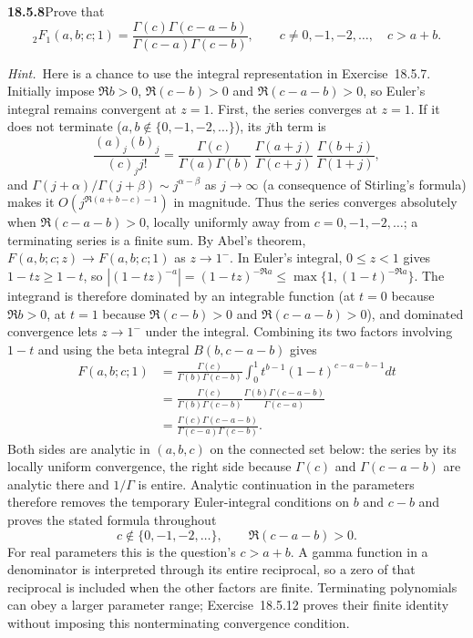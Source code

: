 \par\bigskip
\noindent\textbf{18.5.8}\quad Prove that
\[
{}_{2}F_{1}(a,b;c;1)=\frac{\Gamma(c)\Gamma(c-a-b)}
{\Gamma(c-a)\Gamma(c-b)},\qquad c\neq0,-1,-2,\ldots,\quad c>a+b.
\]
\par\emph{Hint.}~Here is a chance to use the integral
representation in Exercise~18.5.7.
\solution
Initially impose $\Re b>0$, $\Re(c-b)>0$ and
$\Re(c-a-b)>0$, so Euler's integral remains convergent at $z=1$.
First, the series converges at $z=1$.  If it does not terminate
($a,b\notin\{0,-1,-2,\ldots\}$), its $j$th term is
\[
\frac{(a)_j(b)_j}{(c)_jj!}
=\frac{\Gamma(c)}{\Gamma(a)\Gamma(b)}\,
 \frac{\Gamma(a+j)}{\Gamma(c+j)}\,\frac{\Gamma(b+j)}{\Gamma(1+j)},
\]
and $\Gamma(j+\alpha)/\Gamma(j+\beta)\sim j^{\alpha-\beta}$ as
$j\to\infty$ (a consequence of Stirling's formula) makes
it $O(j^{\Re(a+b-c)-1})$ in magnitude.  Thus the series converges
absolutely when $\Re(c-a-b)>0$, locally uniformly away from
$c=0,-1,-2,\ldots$; a terminating series is a finite sum.
By Abel's theorem, $F(a,b;c;z)\to F(a,b;c;1)$ as $z\to1^-$.
In Euler's integral, $0\le z<1$ gives $1-tz\ge1-t$, so
$|(1-tz)^{-a}|=(1-tz)^{-\Re a}\le\max\{1,(1-t)^{-\Re a}\}$.  The
integrand is therefore dominated by an integrable function (at
$t=0$ because $\Re b>0$, at $t=1$ because $\Re(c-b)>0$ and
$\Re(c-a-b)>0$), and dominated convergence lets $z\to1^-$ under
the integral.
Combining its two factors involving $1-t$ and using the beta
integral $B(b,c-a-b)$ gives
\begin{align*}
F(a,b;c;1)
 &=\frac{\Gamma(c)}{\Gamma(b)\Gamma(c-b)}
   \int_0^1t^{b-1}(1-t)^{c-a-b-1}dt\\
 &=\frac{\Gamma(c)}{\Gamma(b)\Gamma(c-b)}
   \frac{\Gamma(b)\Gamma(c-a-b)}{\Gamma(c-a)}\\
 &=\boxed{\frac{\Gamma(c)\Gamma(c-a-b)}
                 {\Gamma(c-a)\Gamma(c-b)}}.
\end{align*}
Both sides are analytic in $(a,b,c)$ on the connected set below:
the series by its locally uniform convergence, the right side
because $\Gamma(c)$ and $\Gamma(c-a-b)$ are analytic there and
$1/\Gamma$ is entire.  Analytic continuation in the
parameters therefore removes the temporary Euler-integral
conditions on $b$ and $c-b$ and proves the stated formula
throughout
\[
c\notin\{0,-1,-2,\ldots\},\qquad \Re(c-a-b)>0.
\]
For real parameters this is the question's $c>a+b$.
A gamma function in a denominator is interpreted through its entire
reciprocal, so a zero of that reciprocal is included when the other
factors are finite.  Terminating polynomials can obey a larger
parameter range; Exercise~18.5.12 proves their finite identity
without imposing this nonterminating convergence condition.

